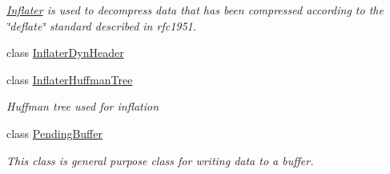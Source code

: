 \begin{DoxyCompactItemize}
\begin{DoxyCompactList}\small\item\em \hyperlink{class_i_c_sharp_code_1_1_sharp_zip_lib_1_1_zip_1_1_compression_1_1_inflater}{Inflater} is used to decompress data that has been compressed according to the \char`\"{}deflate\char`\"{} standard described in rfc1951. \end{DoxyCompactList}\item 
class \hyperlink{class_i_c_sharp_code_1_1_sharp_zip_lib_1_1_zip_1_1_compression_1_1_inflater_dyn_header}{Inflater\+Dyn\+Header}
\item 
class \hyperlink{class_i_c_sharp_code_1_1_sharp_zip_lib_1_1_zip_1_1_compression_1_1_inflater_huffman_tree}{Inflater\+Huffman\+Tree}
\begin{DoxyCompactList}\small\item\em Huffman tree used for inflation \end{DoxyCompactList}\item 
class \hyperlink{class_i_c_sharp_code_1_1_sharp_zip_lib_1_1_zip_1_1_compression_1_1_pending_buffer}{Pending\+Buffer}
\begin{DoxyCompactList}\small\item\em This class is general purpose class for writing data to a buffer. \end{DoxyCompactList}\end{DoxyCompactItemize}
